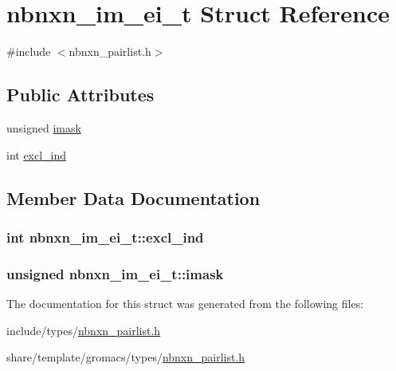 \hypertarget{structnbnxn__im__ei__t}{\section{nbnxn\-\_\-im\-\_\-ei\-\_\-t \-Struct \-Reference}
\label{structnbnxn__im__ei__t}
}


{\ttfamily \#include $<$nbnxn\-\_\-pairlist.\-h$>$}

\subsection*{\-Public \-Attributes}
\begin{DoxyCompactItemize}
\item 
unsigned \hyperlink{structnbnxn__im__ei__t_a5027a87c859deec13817d4ad1b5cbd96}{imask}
\item 
int \hyperlink{structnbnxn__im__ei__t_a95d0cd50bb7ff7b79dba869e1da512f1}{excl\-\_\-ind}
\end{DoxyCompactItemize}


\subsection{\-Member \-Data \-Documentation}
\hypertarget{structnbnxn__im__ei__t_a95d0cd50bb7ff7b79dba869e1da512f1}{
\subsubsection[{excl\-\_\-ind}]{\setlength{\rightskip}{0pt plus 5cm}int {\bf nbnxn\-\_\-im\-\_\-ei\-\_\-t\-::excl\-\_\-ind}}}\label{structnbnxn__im__ei__t_a95d0cd50bb7ff7b79dba869e1da512f1}
\hypertarget{structnbnxn__im__ei__t_a5027a87c859deec13817d4ad1b5cbd96}{
\subsubsection[{imask}]{\setlength{\rightskip}{0pt plus 5cm}unsigned {\bf nbnxn\-\_\-im\-\_\-ei\-\_\-t\-::imask}}}\label{structnbnxn__im__ei__t_a5027a87c859deec13817d4ad1b5cbd96}


\-The documentation for this struct was generated from the following files\-:\begin{DoxyCompactItemize}
\item 
include/types/\hyperlink{include_2types_2nbnxn__pairlist_8h}{nbnxn\-\_\-pairlist.\-h}\item 
share/template/gromacs/types/\hyperlink{share_2template_2gromacs_2types_2nbnxn__pairlist_8h}{nbnxn\-\_\-pairlist.\-h}\end{DoxyCompactItemize}
